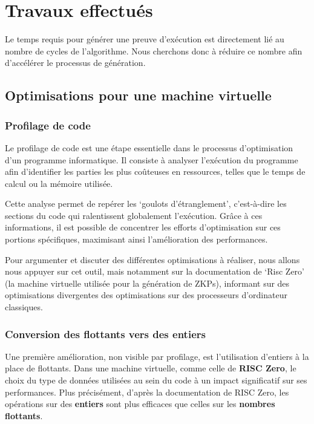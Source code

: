 \documentclass[12pt]{report}
\begin{document}
\chapter{Travaux effectués}

Le temps requis pour générer une preuve d'exécution est directement lié au nombre
de cycles de l'algorithme.
Nous cherchons donc à réduire ce nombre afin d'accélérer le processus de
génération.

\section{Optimisations pour une machine virtuelle}

\subsection{Profilage de code}

Le profilage de code est une étape essentielle dans le processus 
d'optimisation d'un programme informatique. Il consiste à analyser 
l'exécution du programme afin d'identifier les parties les plus 
coûteuses en ressources, telles que le temps de calcul ou la 
mémoire utilisée.

\medskip

Cette analyse permet de repérer les `goulots d'étranglement', 
c'est-à-dire les sections du code qui ralentissent 
globalement l'exécution. Grâce à ces informations, il 
est possible de concentrer les efforts d'optimisation sur 
ces portions spécifiques, maximisant ainsi l'amélioration 
des performances.

\medskip

Pour argumenter et discuter des différentes optimisations à réaliser,
nous allons nous appuyer sur cet outil, mais notamment sur la documentation
de `Risc Zero' (la machine virtuelle utilisée pour la génération de ZKPs), informant
sur des optimisations divergentes des optimisations sur des processeurs d'ordinateur classiques.

\subsection{Conversion des flottants vers des entiers}

Une première amélioration, non visible par profilage, est l'utilisation
d'entiers à la place de flottants. Dans une machine virtuelle, comme celle de 
\textbf{RISC Zero}, le choix du type de données utilisées au sein
du code à un impact significatif sur ses performances. Plus 
précisément, d'après la documentation de RISC Zero, les opérations 
sur des \textbf{entiers} sont plus efficaces que celles sur les \textbf{nombres flottants}. 
\end{document}
